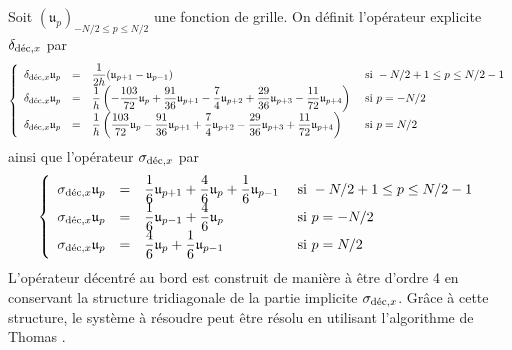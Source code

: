 Soit $(\mathfrak{u}_p)_{-N/2 \leq p \leq N/2}$ une fonction de grille. On définit l'opérateur explicite $\delta_{\dec,x}$ par
\begin{equation}
\left\lbrace
\begin{array}{rcll}
\delta_{\dec,x} \mathfrak{u}_p & = & \dfrac{1}{2 h} (\mathfrak{u}_{p+1}-\mathfrak{u}_{p-1}) & \text{ si } -N/2+1 \leq p \leq N/2-1 \\
\delta_{\dec,x} \mathfrak{u}_p & = & \dfrac{1}{h} \left( -\dfrac{103}{72} \mathfrak{u}_p + \dfrac{91}{36} \mathfrak{u}_{p+1} - \dfrac{7}{4} \mathfrak{u}_{p+2} + \dfrac{29}{36} \mathfrak{u}_{p+3} - \dfrac{11}{72} \mathfrak{u}_{p+4} \right) & \text{ si } p = -N/2 \\
\delta_{\dec,x} \mathfrak{u}_p & = & \dfrac{1}{h} \left( \dfrac{103}{72} \mathfrak{u}_p - \dfrac{91}{36} \mathfrak{u}_{p+1} + \dfrac{7}{4} \mathfrak{u}_{p+2} - \dfrac{29}{36} \mathfrak{u}_{p+3} + \dfrac{11}{72} \mathfrak{u}_{p+4} \right) & \text{ si } p = N/2 \\
\end{array}
\right.
\end{equation}
ainsi que l'opérateur $\sigma_{\dec,x}$ par
\begin{equation}
\left\lbrace
\begin{array}{rcll}
\sigma_{\dec,x} \mathfrak{u}_p & = & \dfrac{1}{6} \mathfrak{u}_{p+1} + \dfrac{4}{6} \mathfrak{u}_{p} + \dfrac{1}{6} \mathfrak{u}_{p-1} & \text{ si } -N/2+1 \leq p \leq N/2-1 \\
\sigma_{\dec,x} \mathfrak{u}_p & = & \dfrac{1}{6} \mathfrak{u}_{p-1} + \dfrac{4}{6} \mathfrak{u}_{p} & \text{ si } p = -N/2 \\
\sigma_{\dec,x} \mathfrak{u}_p & = & \dfrac{4}{6} \mathfrak{u}_{p} + \dfrac{1}{6} \mathfrak{u}_{p-1} & \text{ si } p = N/2 \\
\end{array}
\right.
\end{equation}
L'opérateur décentré au bord est construit de manière à être d'ordre 4 en conservant la structure tridiagonale de la partie implicite $\sigma_{\dec,x}$. Grâce à cette structure, le système à résoudre peut être résolu en utilisant l'algorithme de Thomas \cite{Conte2017, Quarteroni2010}.

